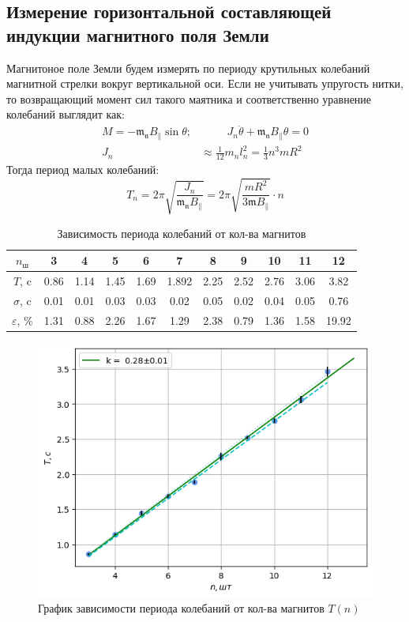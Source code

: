 \subsection*{Измерение горизонтальной составляющей индукции магнитного поля Земли}
Магнитоное поле Земли будем измерять по периоду крутильных колебаний магнитной стрелки вокруг вертикальной оси. Если не учитывать упругость нитки, то возвращающий момент сил такого маятника и соответственно уравнение колебаний выглядит как:
\begin{align}
    M = -\mathfrak{m_n}B_{\parallel}\sin\theta; &\hspace{1cm} J_n\ddot\theta + \mathfrak{m_n}B_{\parallel}\theta = 0\\
    J_n &\approx \frac{1}{12}m_n l_n^2 = \frac{1}{3}n^3mR^2
\end{align}
Тогда период малых колебаний:
\begin{equation}
    T_n = 2\pi\sqrt{\frac{J_n}{\mathfrak{m_n}B_{\parallel}}} = 2\pi\sqrt{\frac{mR^2}{3\mathfrak{m}B_{\parallel}}} \cdot n
\end{equation}
\begin{table}[h!]
    \centering
    \begin{tabular}{|c|c|c|c|c|c|c|c|c|c|c|}
        \hline
        $n_{\text{ш}}$ & 3 & 4 & 5 & 6 & 7 & 8 & 9 & 10 & 11 & 12\\\hline
        $T$, c & 0.86& 1.14& 1.45& 1.69& 1.892& 2.25& 2.52& 2.76& 3.06& 3.82\\\hline
        $\sigma$, c & 0.01& 0.01& 0.03& 0.03& 0.02& 0.05& 0.02& 0.04& 0.05& 0.76\\\hline
        $\varepsilon$, $\%$ & 1.31& 0.88& 2.26& 1.67& 1.29& 2.38& 0.79& 1.36& 1.58& 19.92\\\hline
    \end{tabular}
    \caption{Зависимость периода колебаний от кол-ва магнитов}
\end{table}
\begin{figure}[!h]
    \centering
    \includegraphics[width=12cm]{plot1.png}
    \caption{График зависимости периода колебаний от кол-ва магнитов $T(n)$}
\end{figure}

